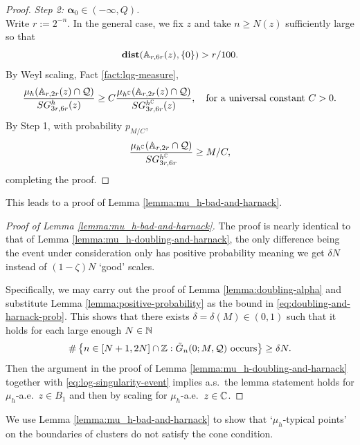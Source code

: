 \documentclass[12pt]{amsart}
\numberwithin{equation}{section}
\begin{document}
\begin{proof}
		
		{\it Step 2: $\boldsymbol{\alpha}_0 \in (-\infty, Q)$.} \\
		Write $r := 2^{-n}$.
		In the general case, we fix $z$ and take $n \geq N(z)$ sufficiently large so that 
		\[
		\mathop{\bf dist{}}(\mathbb{A}_{r, 6 r}(z), \{0\}) > r/100.
		\]
		By Weyl scaling, Fact \ref{fact:lqg-measure}, 
		\[
		\frac{\mu_h(\mathbb{A}_{r,2r}(z) \cap \mathcal Q)}{SG^h_{3r,6r}(z)} \geq C \frac{\mu_{h^{\mathbb{C}}}(\mathbb{A}_{r,2r}(z) \cap \mathcal Q)}{SG^{h^{\mathbb{C}}}_{3r,6r}(z)}, \quad \mbox{for a universal constant $C > 0$}. 
		\]
		By Step 1, with probability $p_{M/C}$, 
		\[
		\frac{\mu_{h^{\mathbb{C}}}(\mathbb{A}_{r,2r} \cap \mathcal Q)}{SG^{h^{\mathbb{C}}}_{3r,6r}} \geq M/C,  
		\]
		completing the proof. 
	\end{proof}
	
	This leads to a proof of Lemma \ref{lemma:mu_h-bad-and-harnack}.
	\begin{proof}[Proof of Lemma \ref{lemma:mu_h-bad-and-harnack}]
		The proof is nearly identical to that of Lemma \ref{lemma:mu_h-doubling-and-harnack}, the only difference
		being the event under consideration only has positive probability meaning we get $\delta N$ instead of $(1-\zeta) N$ `good' scales.
		
		Specifically, we may carry out the proof of Lemma \ref{lemma:doubling-alpha} and substitute Lemma \ref{lemma:positive-probability}
		as the bound in \eqref{eq:doubling-and-harnack-prob}. 
		This shows that there exists $\delta = \delta(M) \in (0,1)$ such that it holds for each large enough $N\in \mathbb{N}$ 
		\begin{equation} \label{eq:log-singularity-event}
		\#\left\{ n \in [N+1,2N]\cap \mathbb{Z}   : \mbox{$\tilde G_n(0; M, \mathcal Q)$ occurs} \right\}  \geq \delta N.
		\end{equation}  
		Then the argument in the proof of Lemma \ref{lemma:mu_h-doubling-and-harnack} together with 
		\eqref{eq:log-singularity-event} implies a.s.\ the lemma statement holds for $\mu_h$-a.e.\ $z\in B_1$ and then by scaling
		for $\mu_h$-a.e.\ $z\in \mathbb{C}$.
	\end{proof}
	
	
	
	
	
	
	We use Lemma \ref{lemma:mu_h-bad-and-harnack} to show that `$\mu_h$-typical points' on the boundaries of clusters do not satisfy the cone condition. 
	
\end{document}
